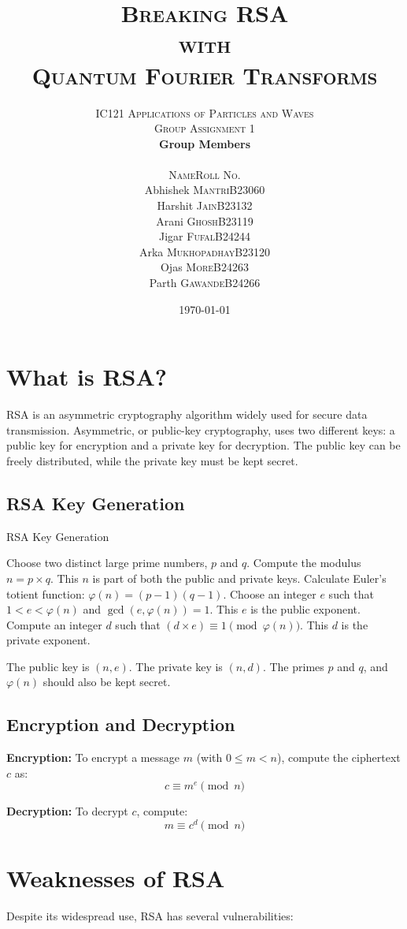 \documentclass{article}
\title{\Huge\textsc{Breaking RSA \\ with \\ Quantum Fourier Transforms}}
\author{
    \Large\textsc{\vspace{2cm} IC121 Applications of Particles and Waves}\\[2ex]
        \LARGE\textsc{Group Assignment 1}\vspace{3cm}\\[2ex]
        \textbf{\Large Group Members}\vspace{0.5cm}\\[1ex]
        \begin{tabular}{r|l} 
            \hline \hline
            \textsc{Name} & \textsc{Roll No.} \\ \hline 
            Abhishek \textsc{Mantri}        & B23060 \\ 
            Harshit \textsc{Jain}           & B23132 \\
            Arani \textsc{Ghosh}            & B23119 \\
            Jigar \textsc{Fufal}            & B24244 \\
            Arka \textsc{Mukhopadhay}       & B23120 \\
            Ojas \textsc{More}              & B24263 \\
            Parth \textsc{Gawande}          & B24266 \\ 
            \hline \hline
        \end{tabular}
        \vspace{2cm}
}
\date{\today}
\begin{document}
\maketitle
\newpage
\tableofcontents
\newpage

\section{What is RSA?}

RSA is an asymmetric cryptography algorithm widely used for secure data transmission. Asymmetric, or public-key cryptography, uses two different keys: a public key for encryption and a private key for decryption. The public key can be freely distributed, while the private key must be kept secret.

\subsection{RSA Key Generation}

\begin{algorithm}
    \caption{RSA Key Generation}
    \begin{algorithmic}[1]
        \State Choose two distinct large prime numbers, $p$ and $q$.
        \State Compute the modulus $n = p \times q$. This $n$ is part of both the public and private keys.
        \State Calculate Euler's totient function: $\varphi(n) = (p - 1)(q - 1)$.
        \State Choose an integer $e$ such that $1 < e < \varphi(n)$ and $\gcd(e, \varphi(n)) = 1$. This $e$ is the public exponent.
        \State Compute an integer $d$ such that $(d \times e) \equiv 1 \pmod{\varphi(n)}$. This $d$ is the private exponent.
    \end{algorithmic}
\end{algorithm}

The public key is $(n, e)$. The private key is $(n, d)$. The primes $p$ and $q$, and $\varphi(n)$ should also be kept secret.

\subsection{Encryption and Decryption}

\textbf{Encryption:} To encrypt a message $m$ (with $0 \leq m < n$), compute the ciphertext $c$ as:
\[
    c \equiv m^e \pmod{n}
\]

\textbf{Decryption:} To decrypt $c$, compute:
\[
    m \equiv c^d \pmod{n}
\]

\section{Weaknesses of RSA}
Despite its widespread use, RSA has several vulnerabilities:
\end{document}
